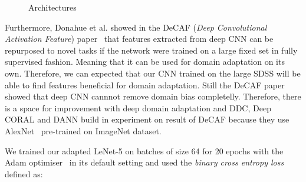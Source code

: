 \begin{figure}
\begin{center}
{
		}
	\end{center}
	\caption{Architectures}
	\label{lenet_5}
\end{figure}

Furthermore, Donahue et al. showed in the DeCAF (\textit{Deep Convolutional Activation Feature}) paper~\cite{donahue2014}
that features extracted from deep CNN can be repurposed to novel tasks
if the network were trained on a large fixed set in fully supervised fashion.
Meaning that it can be used for domain adaptation on its own.
Therefore, we can expected that our CNN trained on the large SDSS
will be able to find features beneficial for domain adaptation.
Still the DeCAF paper showed that
deep CNN cannnot remove domain bias completelly.
Therefore, there is a space for improvement with deep domain adaptation
and DDC, Deep CORAL and DANN build in experiment on result of DeCAF
because they use AlexNet~\cite{krizhevsky2012} pre-trained on ImageNet dataset.

We trained our adapted LeNet-5 on batches of size 64 for 20 epochs
with the Adam optimiser~\cite{kingma2014} in its default setting
and used the \textit{binary cross entropy loss} defined as:

